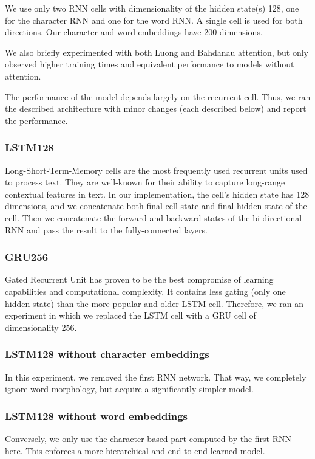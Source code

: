 \documentclass[10pt,conference,compsocconf]{IEEEtran}
\begin{document}
We use only two RNN cells with dimensionality of the hidden state(s) 128, one for the character RNN and one for the word RNN. A single cell is used for both directions. Our character and word embeddings have 200 dimensions. 

We also briefly experimented with both Luong \cite{luong} and Bahdanau \cite{bahdanau} attention, but only observed higher training times and equivalent performance to models without attention.

The performance of the model depends largely on the recurrent cell. Thus, we ran the described architecture with minor changes (each described below) and report the performance.

\subsubsection{LSTM128}
Long-Short-Term-Memory \cite{lstm} cells are the most frequently used recurrent units used to process text. They are well-known for their ability to capture long-range contextual features in text. In our implementation, the cell's hidden state has 128 dimensions, and we concatenate both final cell state and final hidden state of the cell. Then we concatenate the forward and backward states of the bi-directional RNN and pass the result to the fully-connected layers.

\subsubsection{GRU256}
Gated Recurrent Unit \cite{gru} has proven to be the best compromise of learning capabilities and computational complexity. It contains less gating (only one hidden state) than the more popular and older LSTM cell. Therefore, we ran an experiment in which we replaced the LSTM cell with a GRU cell of dimensionality 256.

\subsubsection{LSTM128 without character embeddings}
In this experiment, we removed the first RNN network. That way, we completely ignore word morphology, but acquire a significantly simpler model.

\subsubsection{LSTM128 without word embeddings}
Conversely, we only use the character based part computed by the first RNN here. This enforces a more hierarchical and end-to-end learned model.
\end{document}
